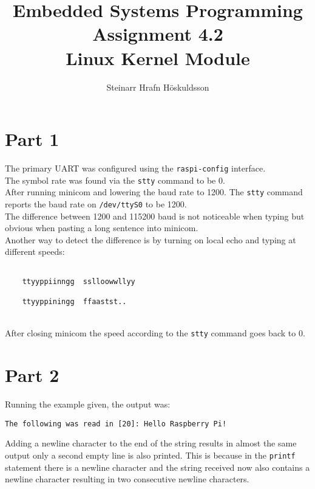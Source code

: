 \documentclass{article}
\title{Embedded Systems Programming \\ Assignment 4.2 \\ \large Linux Kernel Module}
\author{Steinarr Hrafn Höskuldsson}
\newcommand{\mycomment}[1]{}
\begin{document}
\pagestyle{firststyle}
{\let\newpage\relax\maketitle}

\mycomment{
\begin{figure}[h]
    \centering
    \texttt{[image: LAB3/Basic1.png]}
    \caption{"Switch test" Breadboard set up}
    \label{fig:Switch_test}
\end{figure}



}


\section*{Part 1}
The primary UART was configured using the \verb!raspi-config! interface. 
\\
The symbol rate was found via the \verb!stty! command to be 0.
\\
After running minicom and lowering the baud rate to 1200.  The \verb!stty! command reports the baud rate on \verb"/dev/ttyS0" to be 1200.
\\
The difference between 1200 and 115200 baud is not noticeable when typing but obvious when pasting a long sentence into minicom.
\\
Another way to detect the difference is by turning on local echo and typing at different speeds:
\begin{verbatim}
    
    ttyyppiinngg  sslloowwllyy
    
    ttyyppiningg  ffaastst..
\end{verbatim}

\\
After closing minicom the speed according to the \verb"stty" command goes back to 0.


\section*{Part 2}

Running the example given, the output was:
\begin{verbatim}
The following was read in [20]: Hello Raspberry Pi!
\end{verbatim}
Adding a newline character to the end of the string results in almost the same output only a second empty line is also printed. This is because in the \verb!printf! statement there is a newline character and the string received now also contains a newline character resulting in two consecutive newline characters.
\end{document}
